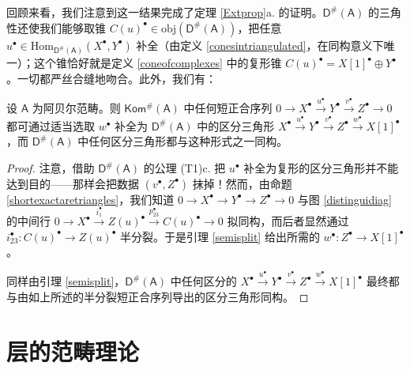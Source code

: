 回顾来看，我们注意到这一结果完成了定理 \ref{Extprop}a.\!\! 的证明。$\mathsf{D^\#\!(A)}$ 的三角性还使我们能够取锥 $C(u)^\bullet\in\text{obj}(\mathsf{D^\#\!(A)})$，把任意 $u^\bullet\in\text{Hom}_\mathsf{D^\#\!(A)}(X^\bullet, Y^\bullet)$ 补全（由定义 \ref{conesintriangulated}，在同构意义下唯一）；这个锥恰好就是定义 \ref{coneofcomplexes} 中的复形锥 $C(u)^\bullet=X[1]^\bullet\oplus Y^\bullet$。一切都严丝合缝地吻合。此外，我们有：

\begin{Cor}
	设 $\mathsf{A}$ 为阿贝尔范畴。则 $\mathsf{Kom^\#\!(A)}$ 中任何短正合序列 $0\rightarrow X^\bullet\xrightarrow{u^\bullet} Y^\bullet\xrightarrow{v^\bullet} Z^\bullet\rightarrow 0$ 都可通过适当选取 $w^\bullet$ 补全为 $\mathsf{D^\#\!(A)}$ 中的区分三角形 $X^\bullet\xrightarrow{u^\bullet} Y^\bullet\xrightarrow{v^\bullet} Z^\bullet\xrightarrow{w^\bullet} X[1]^\bullet$，而 $\mathsf{D^\#\!(A)}$ 中任何区分三角形都与这种形式之一同构。
\end{Cor}

\begin{proof}
	注意，借助 $\mathsf{D^\#\!(A)}$ 的公理 {(T1)c.} 把 $u^\bullet$ 补全为复形的区分三角形并不能达到目的——那样会把数据 $(v^\bullet,Z^\bullet)$ 抹掉！然而，由命题 \ref{shortexactaretriangles}，我们知道 $0\rightarrow X^\bullet\rightarrow Y^\bullet\rightarrow Z^\bullet\rightarrow 0$ 与图 \eqref{distinguidiag} 的中间行 $0\rightarrow X^\bullet\xrightarrow{i_1^\bullet}Z(u)^\bullet\xrightarrow{p_{23}^\bullet}C(u)^\bullet\rightarrow 0$ 拟同构，而后者显然通过 $i_{23}^\bullet:C(u)^\bullet\rightarrow Z(u)^\bullet$ 半分裂。于是引理 \ref{semisplit} 给出所需的 $w^\bullet:Z^\bullet\rightarrow X[1]^\bullet$。
	
	同样由引理 \ref{semisplit}，$\mathsf{D^\#\!(A)}$ 中任何区分的 $X^\bullet\xrightarrow{u^\bullet} Y^\bullet\xrightarrow{v^\bullet} Z^\bullet\xrightarrow{w^\bullet} X[1]^\bullet$ 最终都与由如上所述的半分裂短正合序列导出的区分三角形同构。
\end{proof}	






\newpage





\part{层的范畴理论}
\thispagestyle{plain}

\vspace*{2cm}


